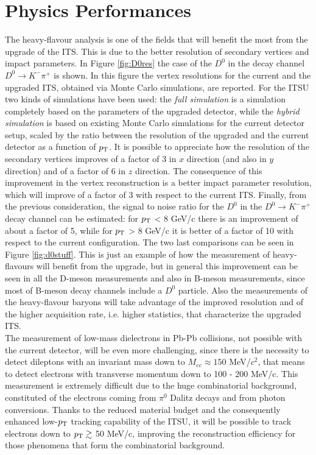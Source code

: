 \section{Physics Performances}
The heavy-flavour analysis is one of the fields that will benefit the most from the upgrade of the ITS. This is due to the better resolution of secondary vertices and impact parameters. In Figure \ref{fig:D0res} the case of the $D^0$ in the decay channel $D^0 \rightarrow K^-\pi^+$ is shown. In this figure the vertex resolutions for the current and the upgraded ITS, obtained via Monte Carlo simulations,  are reported. For the ITSU two kinds of simulations have been used: the \textit{full simulation} is a simulation completely based on the parameters of the upgraded detector, while the \textit{hybrid simulation} is based on existing Monte Carlo simulations for the current detector setup, scaled by the ratio between the resolution of the upgraded and the current detector as a function of $p_\text{T}$. It is possible to appreciate how the resolution of the secondary vertices improves of a factor of 3 in $x$ direction (and also in $y$ direction) and of a factor of 6 in $z$ direction. The consequence of this improvement in the vertex reconstruction is a better impact parameter resolution, which will improve of a factor of 3 with respect to the current ITS. Finally, from the previous consideration, the signal to noise ratio for the $D^0$ in the $D^0 \rightarrow K^-\pi^+$ decay channel can be estimated: for $p_\text{T}$ < 8 GeV/c there is an improvement of about a factor of 5, while for $p_\text{T}$ > 8 GeV/c it is better of a factor of 10 with respect to the current configuration. The two last comparisons can be seen in Figure \ref{fig:d0stuff}. This is just an example of how the measurement of heavy-flavours will benefit from the upgrade, but in general this improvement can be seen in all the D-meson measurements and also in B-meson measurements, since most of B-meson decay channels include a $D^0$ particle. Also the measurements of the heavy-flavour baryons will take advantage of the improved resolution and of the higher acquisition rate, i.e. higher statistics, that characterize the upgraded ITS.\\
The measurement of low-mass dielectrons in Pb-Pb collisions, not possible with the current detector, will be even more challenging, since there is the necessity to detect dileptons with an invariant mass down to $M_{ee} \approx 150$ MeV/$c^2$, that means to detect electrons with transverse momentum down to 100 - 200 MeV/c. This measurement is extremely difficult due to the huge combinatorial background, constituted of the electrons coming from $\pi^0$ Dalitz decays and from photon conversions. Thanks to the reduced material budget and the consequently enhanced low-$p_\text{T}$ tracking capability of the ITSU, it will be possible to track electrons down to $p_\text{T} \gtrsim $ 50 MeV/c, improving the reconstruction efficiency for those phenomena that form the combinatorial background.

